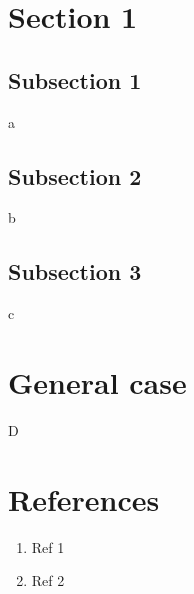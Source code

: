 \documentclass{article}
\theoremstyle{definition}
\begin{document}
\section{Section 1}

	\subsection{ Subsection 1}
	a

\subsection{ Subsection 2}
	b

\subsection{ Subsection 3}
c


\section{General case}
	


D




\section*{References}
\begin{enumerate}
\item Ref 1
\item Ref 2
\end{enumerate}
\end{document}
